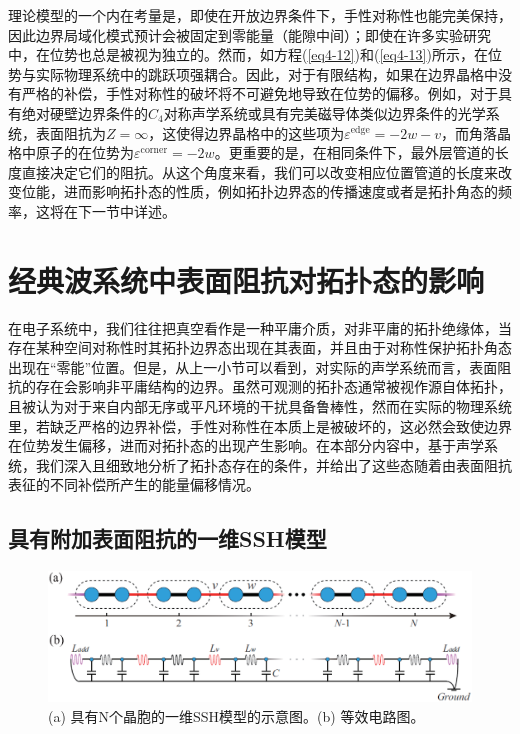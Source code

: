 理论模型的一个内在考量是，即使在开放边界条件下，手性对称性也能完美保持，因此边界局域化模式预计会被固定到零能量（能隙中间）；即使在许多实验研究中，在位势也总是被视为独立的。然而，如方程(\ref{eq4-12})和(\ref{eq4-13})所示，在位势与实际物理系统中的跳跃项强耦合。因此，对于有限结构，如果在边界晶格中没有严格的补偿，手性对称性的破坏将不可避免地导致在位势的偏移。例如，对于具有绝对硬壁边界条件的$C_4$对称声学系统或具有完美磁导体类似边界条件的光学系统，表面阻抗为$Z = \infty$，这使得边界晶格中的这些项为$\varepsilon^{\text{edge}} = -2w - v$，而角落晶格中原子的在位势为$\varepsilon^{\text{corner}} = -2w$。更重要的是，在相同条件下，最外层管道的长度直接决定它们的阻抗。从这个角度来看，我们可以改变相应位置管道的长度来改变位能，进而影响拓扑态的性质，例如拓扑边界态的传播速度或者是拓扑角态的频率，这将在下一节中详述。

\section{经典波系统中表面阻抗对拓扑态的影响}

在电子系统中，我们往往把真空看作是一种平庸介质，对非平庸的拓扑绝缘体，当存在某种空间对称性时其拓扑边界态出现在其表面，并且由于对称性保护拓扑角态出现在“零能”位置。但是，从上一小节可以看到，对实际的声学系统而言，表面阻抗的存在会影响非平庸结构的边界。虽然可观测的拓扑态通常被视作源自体拓扑，且被认为对于来自内部无序或平凡环境的干扰具备鲁棒性，然而在实际的物理系统里，若缺乏严格的边界补偿，手性对称性在本质上是被破坏的，这必然会致使边界在位势发生偏移，进而对拓扑态的出现产生影响。在本部分内容中，基于声学系统，我们深入且细致地分析了拓扑态存在的条件，并给出了这些态随着由表面阻抗表征的不同补偿所产生的能量偏移情况。 

\subsection{具有附加表面阻抗的一维SSH模型}

\begin{figure}[h!]
    \centering
    \includegraphics[width=1\textwidth]{images/fig4-3.eps} 
    \caption{(a) 具有N个晶胞的一维SSH模型的示意图。(b) 等效电路图。}
    \label{fig_4_3}
  \end{figure}  

